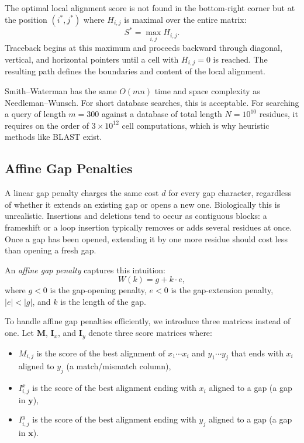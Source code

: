 The optimal local alignment score is not found in the bottom-right corner but at the position $(i^*, j^*)$ where $H_{i,j}$ is maximal over the entire matrix:
\begin{equation}
  \label{eq:sw-max}
  S^* = \max_{i,j} H_{i,j}.
\end{equation}
Traceback begins at this maximum and proceeds backward through diagonal, vertical, and horizontal pointers until a cell with $H_{i,j} = 0$ is reached. The resulting path defines the boundaries and content of the local alignment.

Smith--Waterman has the same $O(mn)$ time and space complexity as Needleman--Wunsch. For short database searches, this is acceptable. For searching a query of length $m = 300$ against a database of total length $N = 10^{10}$ residues, it requires on the order of $3 \times 10^{12}$ cell computations, which is why heuristic methods like BLAST exist.


\subsection{Affine Gap Penalties}
\label{sec:affine-gaps}

A linear gap penalty charges the same cost $d$ for every gap character, regardless of whether it extends an existing gap or opens a new one. Biologically this is unrealistic. Insertions and deletions tend to occur as contiguous blocks: a frameshift or a loop insertion typically removes or adds several residues at once. Once a gap has been opened, extending it by one more residue should cost less than opening a fresh gap.

An \emph{affine gap penalty} captures this intuition:
\begin{equation}
  \label{eq:affine-gap}
  W(k) = g + k \cdot e,
\end{equation}
where $g < 0$ is the gap-opening penalty, $e < 0$ is the gap-extension penalty, $|e| < |g|$, and $k$ is the length of the gap.

To handle affine gap penalties efficiently, we introduce three matrices instead of one. Let $\mathbf{M}$, $\mathbf{I}_x$, and $\mathbf{I}_y$ denote three score matrices where:
\begin{itemize}
  \item $M_{i,j}$ is the score of the best alignment of $x_1 \cdots x_i$ and $y_1 \cdots y_j$ that ends with $x_i$ aligned to $y_j$ (a match/mismatch column),
  \item $I^x_{i,j}$ is the score of the best alignment ending with $x_i$ aligned to a gap (a gap in $\mathbf{y}$),
  \item $I^y_{i,j}$ is the score of the best alignment ending with $y_j$ aligned to a gap (a gap in $\mathbf{x}$).
\end{itemize}

